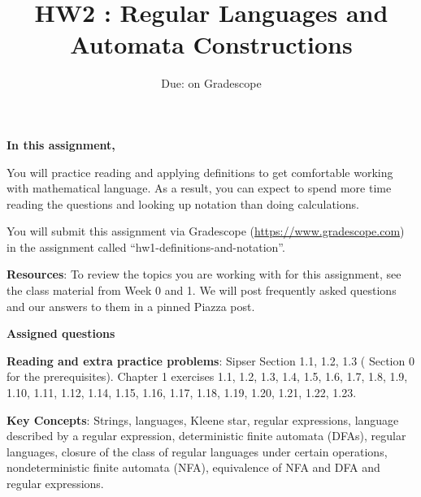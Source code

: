 

\title{HW2 : Regular Languages and Automata Constructions}
\date{Due: on Gradescope}


\maketitle
\thispagestyle{fancy}


{\bf In this assignment,}

You will practice reading and
applying definitions to get comfortable working with mathematical language. As
a result, you can expect to spend more time reading the questions and looking
up notation than doing calculations.

\instructions

You will submit this assignment via Gradescope
(\href{https://www.gradescope.com}{https://www.gradescope.com}) 
in the assignment called ``hw1-definitions-and-notation''.


{\bf Resources}: To review the topics you are working with 
for this assignment, see the class material from  Week 0 and 1.
We will post frequently asked questions and our answers to them in a 
pinned Piazza post.

{\bf Assigned questions}



{\bf Reading and extra practice problems}: Sipser Section 1.1, 1.2, 1.3 ( Section 0 for the prerequisites).
Chapter 1 exercises 1.1, 1.2, 1.3, 1.4, 1.5, 1.6, 1.7, 1.8, 1.9, 1.10, 1.11, 1.12, 1.14, 1.15, 1.16, 1.17, 1.18, 1.19, 1.20, 1.21, 1.22, 1.23.

{\bf Key Concepts}: Strings, languages, Kleene star, regular expressions, language described by a regular expression, deterministic finite automata (DFAs), regular languages, closure of the class of regular languages under certain operations, nondeterministic finite automata (NFA), equivalence of NFA and DFA and regular expressions.


